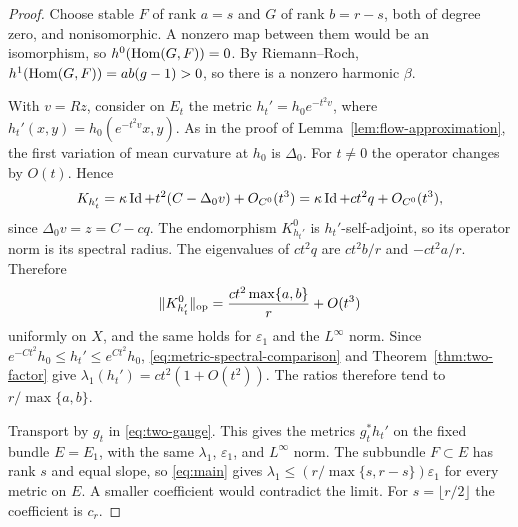 \begin{proof}
Choose stable $F$ of rank $a=s$ and $G$ of rank $b=r-s$, both of degree
zero, and nonisomorphic. A nonzero map between them would be an
isomorphism, so $h^0(\operatorname{Hom}(G,F))=0$. By Riemann--Roch,
$h^1(\operatorname{Hom}(G,F))=ab(g-1)>0$, so there is a nonzero harmonic $\beta$.

With $v=Rz$, consider on $E_t$ the metric $h_t'=h_0e^{-t^2v}$, where
$h_t'(x,y)=h_0(e^{-t^2v}x,y)$. As in the proof of
Lemma~\ref{lem:flow-approximation}, the first variation of mean curvature
at $h_0$ is $\Delta_0$. For $t\ne0$ the operator changes by $O(t)$. Hence
\[
 K_{h_t'}=\kappa\operatorname{Id}+t^2(C-\Delta_0v)+O_{C^0}(t^3)
 =\kappa\operatorname{Id}+ct^2q+O_{C^0}(t^3),
\]
since $\Delta_0v=z=C-cq$. The endomorphism $K^0_{h_t'}$ is
$h_t'$-self-adjoint, so its operator norm is its spectral radius. The
eigenvalues of $ct^2q$ are $ct^2b/r$ and $-ct^2a/r$. Therefore
\[
 \lVert K^0_{h_t'}\rVert_{\mathrm{op}}=\frac{ct^2\max\{a,b\}}r+O(t^3)
\]
uniformly on $X$, and the same holds for $\varepsilon_1$ and the $L^\infty$
norm. Since $e^{-Ct^2}h_0\le h_t'\le e^{Ct^2}h_0$,
\eqref{eq:metric-spectral-comparison} and Theorem~\ref{thm:two-factor} give
$\lambda_1(h_t')=ct^2(1+O(t^2))$. The ratios therefore tend to
$r/\max\{a,b\}$.

Transport by $g_t$ in \eqref{eq:two-gauge}. This gives the metrics
$g_t^*h_t'$ on the fixed bundle $E=E_1$, with the same $\lambda_1$,
$\varepsilon_1$, and $L^\infty$ norm. The subbundle $F\subset E$ has rank
$s$ and equal slope, so \eqref{eq:main} gives
$\lambda_1\le(r/\max\{s,r-s\})\varepsilon_1$ for every metric on $E$. A
smaller coefficient would contradict the limit. For $s=\lfloor r/2\rfloor$
the coefficient is $c_r$.
\end{proof}

